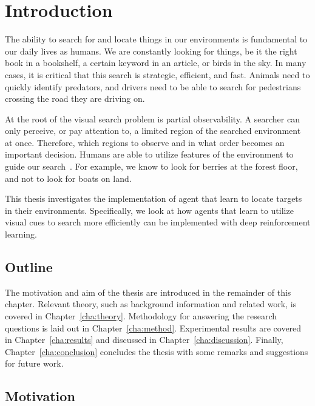 \chapter{Introduction}
\label{cha:introduction}

The ability to search for and locate things in our environments is fundamental to our daily lives as humans.
We are constantly looking for things, be it the right book in a bookshelf, a certain keyword in an article, or birds in the sky.
In many cases, it is critical that this search is strategic, efficient, and fast.
Animals need to quickly identify predators, and drivers need to be able to search for pedestrians crossing the road they are driving on.

At the root of the visual search problem is partial observability.
A searcher can only perceive, or pay attention to, a limited region of the searched environment at once.
Therefore, which regions to observe and in what order becomes an important decision. 
Humans are able to utilize features of the environment to guide our search~\cite{wolfe_five_2017,eckstein_visual_2011,nakayama_situating_2011}.
For example, we know to look for berries at the forest floor, and not to look for boats on land.

This thesis investigates the implementation of agent that learn to locate targets in their environments.
Specifically, we look at how agents that learn to utilize visual cues to search more efficiently can be implemented with deep reinforcement learning.

\section{Outline}
\label{sec:outline}

The motivation and aim of the thesis are introduced in the remainder of this chapter. 
Relevant theory, such as background information and related work, is covered in Chapter~\ref{cha:theory}.
Methodology for answering the research questions is laid out in Chapter~\ref{cha:method}.
Experimental results are covered in Chapter~\ref{cha:results} and discussed in Chapter~\ref{cha:discussion}.
Finally, Chapter~\ref{cha:conclusion} concludes the thesis with some remarks and suggestions for future work.

\section{Motivation}
\label{sec:motivation}

